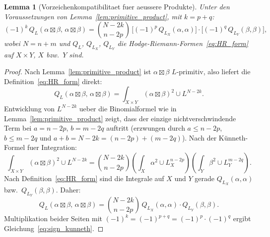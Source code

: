 \documentclass[aps,prd,twocolumn,superscriptaddress,nofootinbib]{revtex4-2}
\newtheorem{lemma}[theorem]{Lemma}
\theoremstyle{definition}
\theoremstyle{remark}
\begin{document}
\begin{lemma}[Vorzeichenkompatibilitaet fuer aeussere Produkte]
\label{lem:sign_product}
Unter den Voraussetzungen von Lemma~\ref{lem:primitive_product}, mit $k = p + q$:
\begin{equation}
(-1)^k\, Q_L(\alpha \boxtimes \beta,\, \alpha \boxtimes \beta) = \binom{N-2k}{n-2p}\, \bigl[(-1)^p\, Q_{L_X}(\alpha, \alpha)\bigr] \cdot \bigl[(-1)^q\, Q_{L_Y}(\beta, \beta)\bigr],
\label{eq:sign_kunneth}
\end{equation}
wobei $N = n + m$ und $Q_L$, $Q_{L_X}$, $Q_{L_Y}$ die Hodge-Riemann-Formen~\eqref{eq:HR_form} auf $X \times Y$, $X$ bzw.\ $Y$ sind.
\end{lemma}

\begin{proof}
Nach Lemma~\ref{lem:primitive_product} ist $\alpha \boxtimes \beta$ $L$-primitiv, also liefert die Definition~\eqref{eq:HR_form} direkt:
\[
Q_L(\alpha \boxtimes \beta,\, \alpha \boxtimes \beta) = \int_{X \times Y} (\alpha \boxtimes \beta)^2 \cup L^{N-2k}.
\]
Entwicklung von $L^{N-2k}$ ueber die Binomialformel wie in Lemma~\ref{lem:primitive_product} zeigt, dass der einzige nichtverschwindende Term bei $a = n - 2p$, $b = m - 2q$ auftritt (erzwungen durch $a \leq n-2p$, $b \leq m-2q$ und $a + b = N - 2k = (n-2p) + (m-2q)$). Nach der K\"unneth-Formel fuer Integration:
\[
\int_{X \times Y} (\alpha \boxtimes \beta)^2 \cup L^{N-2k} = \binom{N-2k}{n-2p} \left(\int_X \alpha^2 \cup L_X^{n-2p}\right) \left(\int_Y \beta^2 \cup L_Y^{m-2q}\right).
\]
Nach Definition~\eqref{eq:HR_form} sind die Integrale auf $X$ und $Y$ gerade $Q_{L_X}(\alpha, \alpha)$ bzw.\ $Q_{L_Y}(\beta, \beta)$. Daher:
\[
Q_L(\alpha \boxtimes \beta,\, \alpha \boxtimes \beta) = \binom{N-2k}{n-2p}\, Q_{L_X}(\alpha, \alpha) \cdot Q_{L_Y}(\beta, \beta).
\]
Multiplikation beider Seiten mit $(-1)^k = (-1)^{p+q} = (-1)^p \cdot (-1)^q$ ergibt Gleichung~\eqref{eq:sign_kunneth}.
\end{proof}
\end{document}
